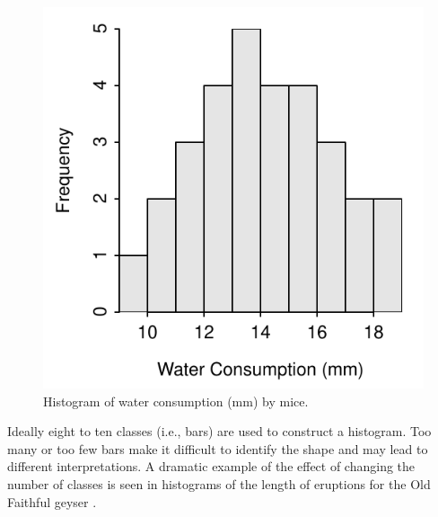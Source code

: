 \documentclass[10pt,openany]{book}\usepackage[]{graphicx}\usepackage[]{color}
\newenvironment{knitrout}{}{} %
\begin{document}
\begin{knitrout}
\color{fgcolor}\begin{figure}[hbtp]

{\centering \includegraphics[width=.4\linewidth]{Figs/MouseHist2-1} 

}

\caption[Histogram of water consumption (mm) by mice]{Histogram of water consumption (mm) by mice.}\label{fig:MouseHist2}
\end{figure}


\end{knitrout}

Ideally eight to ten classes (i.e., bars) are used to construct a histogram.  Too many or too few bars make it difficult to identify the shape and may lead to different interpretations.  A dramatic example of the effect of changing the number of classes is seen in histograms of the length of eruptions for the Old Faithful geyser .
\end{document}
